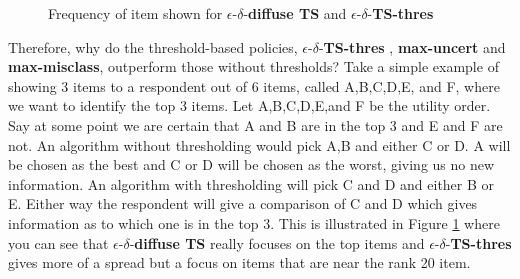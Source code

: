 \documentclass[a4paper,12pt]{article}
\newcommand{\mismin}{\textbf{max-misclass}}
\newcommand{\edts}{$\epsilon$-$\delta$-\textbf{diffuse TS} }
\newcommand{\edtsthres}{$\epsilon$-$\delta$-\textbf{TS-thres} }
\newcommand{\uncert}{\textbf{max-uncert} }
\begin{document}
\begin{figure}%
    \caption{Frequency of item shown for \edts and \edtsthres}%
    \label{fig:Frequency}%
 	\begin{center}
    \qquad
	\end{center}
\end{figure}

Therefore, why do the threshold-based policies, \edtsthres, \uncert and \mismin, outperform those without thresholds? Take a simple example of showing 3 items to a respondent out of 6 items, called A,B,C,D,E, and F, where we want to identify the top 3 items. Let A,B,C,D,E,and F be the utility order. Say at some point we are certain that A and B are in the top 3 and E and F are not. An algorithm without thresholding would pick A,B and either C or D. A will be chosen as the best and C or D will be chosen as the worst, giving us no new information. An algorithm with thresholding will pick C and D and either B or E. Either way the respondent will give a comparison of C and D which gives information as to which one is in the top 3. This is illustrated in Figure \ref{fig:Frequency} where you can see that \edts really focuses on the top items and \edtsthres gives more of a spread but a focus on items that are near the rank 20 item.
\end{document}
